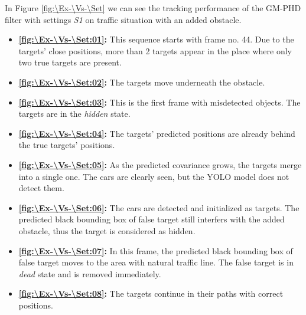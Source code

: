 In Figure \ref{fig:\Ex-\Vs-\Set} we can see the tracking performance of the GM-PHD filter with settings \textit{S1} on traffic situation with an added obstacle.
\begin{itemize}
    \item \textbf{\ref{fig:\Ex-\Vs-\Set:01}:} This sequence starts with frame no. 44. Due to the targets' close
    positions, more than 2 targets appear in the place where only two true targets are present.
    \item \textbf{\ref{fig:\Ex-\Vs-\Set:02}:} The targets move underneath the obstacle.
    \item \textbf{\ref{fig:\Ex-\Vs-\Set:03}:} This is the first frame with misdetected objects. The targets are in the \textit{hidden} state.
    \item \textbf{\ref{fig:\Ex-\Vs-\Set:04}:} The targets' predicted positions are already behind the true targets' positions.
    \item \textbf{\ref{fig:\Ex-\Vs-\Set:05}:} As the predicted covariance grows, the targets merge into a single one. The cars are clearly seen, but the YOLO model does not detect them.
    \item \textbf{\ref{fig:\Ex-\Vs-\Set:06}:} The cars are detected and initialized as targets. The predicted black bounding box of false target still interfers with the added obstacle, thus the target is considered as hidden.
    \item \textbf{\ref{fig:\Ex-\Vs-\Set:07}:} In this frame, the predicted black bounding box of false target moves to the area with natural traffic line. The false target is in \textit{dead} state and is removed immediately.
    \item \textbf{\ref{fig:\Ex-\Vs-\Set:08}:} The targets continue in their paths with correct positions.
\end{itemize}


